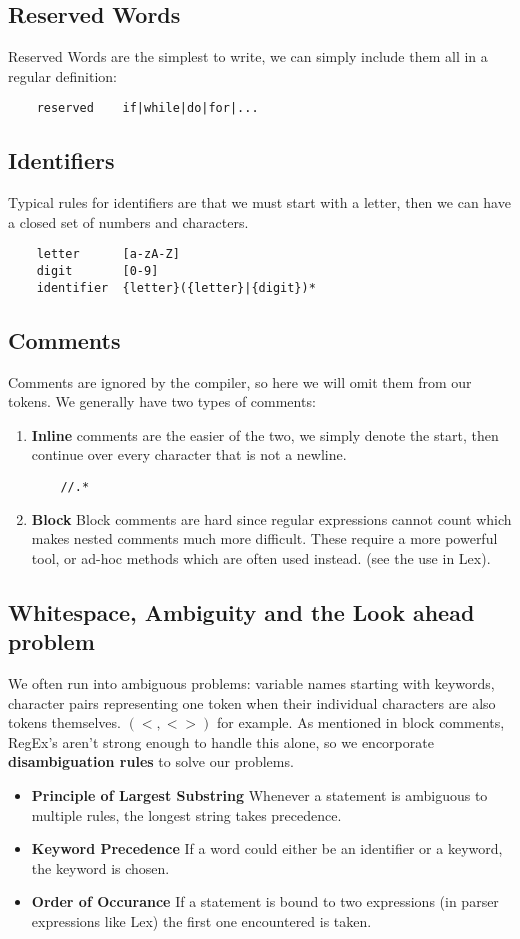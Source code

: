 \documentclass{report}
\theoremstyle{definition}
\begin{document}
		\subsection{Reserved Words}
			Reserved Words are the simplest to write, we can simply include them all in a regular definition:
\begin{lstlisting}
	reserved	if|while|do|for|...
\end{lstlisting}
		\subsection{Identifiers}
			Typical rules for identifiers are that we must start with a letter, then we can have a closed set of numbers
			and characters.
\begin{lstlisting}
	letter		[a-zA-Z]
	digit		[0-9]
	identifier	{letter}({letter}|{digit})*
\end{lstlisting}
		\subsection{Comments}
			Comments are ignored by the compiler, so here we will omit them from our tokens. We generally have two
			types of comments:
			\begin{enumerate}
				\item \textbf{Inline} comments are the easier of the two, we simply denote the start, then continue over
					every character that is not a newline.
\begin{lstlisting}
	//.*
\end{lstlisting}
				\item \textbf{Block} Block comments are hard since regular expressions cannot count which makes
					nested comments much more difficult. These require a more powerful tool, or ad-hoc methods 
					which are often used instead. (see the use in Lex).
			\end{enumerate}
		\subsection{Whitespace, Ambiguity and the Look ahead problem}
			We often run into ambiguous problems: variable names starting with keywords, character pairs representing one token
			when their individual characters are also tokens themselves. $(<, <>)$ for example. As mentioned in block
			comments, RegEx's aren't strong enough to handle this alone, so we encorporate \textbf{disambiguation rules}
			to solve our problems.
			\begin{itemize}
				\item \textbf{Principle of Largest Substring}
					Whenever a statement is ambiguous to multiple rules, the longest string takes precedence.
				\item \textbf{Keyword Precedence}
					If a word could either be an identifier or a keyword, the keyword is chosen.
				\item \textbf{Order of Occurance}
					If a statement is bound to two expressions (in parser expressions like Lex) the first one encountered
					is taken.
			\end{itemize}
\end{document}
